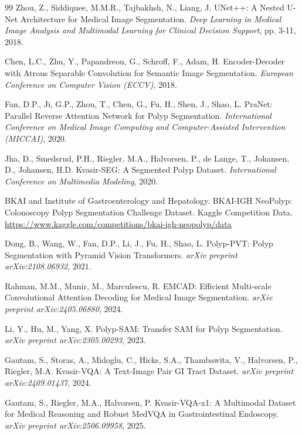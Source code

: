 \begin{thebibliography}{99}
         Zhou, Z., Siddiquee, M.M.R., Tajbakhsh, N., Liang, J. UNet++: A Nested U-Net Architecture for Medical Image Segmentation. \textit{Deep Learning in Medical Image Analysis and Multimodal Learning for Clinical Decision Support}, pp. 3-11, 2018.
        
         Chen, L.C., Zhu, Y., Papandreou, G., Schroff, F., Adam, H. Encoder-Decoder with Atrous Separable Convolution for Semantic Image Segmentation. \textit{European Conference on Computer Vision (ECCV)}, 2018.
        
         Fan, D.P., Ji, G.P., Zhou, T., Chen, G., Fu, H., Shen, J., Shao, L. PraNet: Parallel Reverse Attention Network for Polyp Segmentation. \textit{International Conference on Medical Image Computing and Computer-Assisted Intervention (MICCAI)}, 2020.
        
         Jha, D., Smedsrud, P.H., Riegler, M.A., Halvorsen, P., de Lange, T., Johansen, D., Johansen, H.D. Kvasir-SEG: A Segmented Polyp Dataset. \textit{International Conference on Multimedia Modeling}, 2020.

         BKAI and Institute of Gastroenterology and Hepatology. BKAI-IGH NeoPolyp: Colonoscopy Polyp Segmentation Challenge Dataset. Kaggle Competition Data. \url{https://www.kaggle.com/competitions/bkai-igh-neopolyp/data}
        
         Dong, B., Wang, W., Fan, D.P., Li, J., Fu, H., Shao, L. Polyp-PVT: Polyp Segmentation with Pyramid Vision Transformers. \textit{arXiv preprint arXiv:2108.06932}, 2021.
        
         Rahman, M.M., Munir, M., Marculescu, R. EMCAD: Efficient Multi-scale Convolutional Attention Decoding for Medical Image Segmentation. \textit{arXiv preprint arXiv:2405.06880}, 2024.
        
         Li, Y., Hu, M., Yang, X. Polyp-SAM: Transfer SAM for Polyp Segmentation. \textit{arXiv preprint arXiv:2305.00293}, 2023.
        
         Gautam, S., Storas, A., Midoglu, C., Hicks, S.A., Thambawita, V., Halvorsen, P., Riegler, M.A. Kvasir-VQA: A Text-Image Pair GI Tract Dataset. \textit{arXiv preprint arXiv:2409.01437}, 2024.
        
         Gautam, S., Riegler, M.A., Halvorsen, P. Kvasir-VQA-x1: A Multimodal Dataset for Medical Reasoning and Robust MedVQA in Gastrointestinal Endoscopy. \textit{arXiv preprint arXiv:2506.09958}, 2025.


\end{thebibliography}
